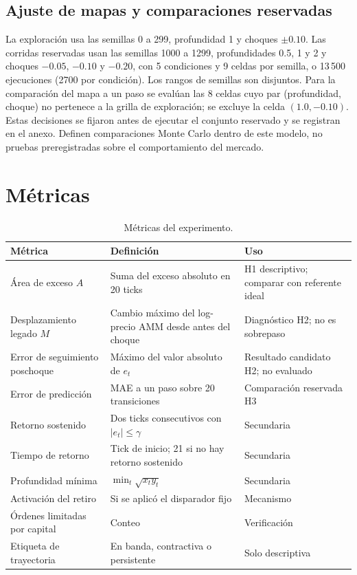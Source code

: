 \subsection{Ajuste de mapas y comparaciones reservadas}

La exploración usa las semillas 0 a 299, profundidad 1 y choques $\pm0.10$. Las corridas reservadas usan las semillas 1000 a 1299, profundidades 0.5, 1 y 2 y choques $-0.05$, $-0.10$ y $-0.20$, con 5 condiciones y 9 celdas por semilla, o 13\,500 ejecuciones (2700 por condición). Los rangos de semillas son disjuntos. Para la comparación del mapa a un paso se evalúan las 8 celdas cuyo par (profundidad, choque) no pertenece a la grilla de exploración; se excluye la celda $(1.0,-0.10)$. Estas decisiones se fijaron antes de ejecutar el conjunto reservado y se registran en el anexo. Definen comparaciones Monte Carlo dentro de este modelo, no pruebas preregistradas sobre el comportamiento del mercado.

\section{Métricas}

\begin{table}[htbp]
\centering
\caption{Métricas del experimento.}
\label{tab:metricas}
\small
\begin{tabularx}{\textwidth}{@{}l >{\raggedright\arraybackslash}X l@{}}
\toprule
Métrica & Definición & Uso \\
\midrule
Área de exceso $A$ & Suma del exceso absoluto en 20 ticks & H1 descriptivo; comparar con referente ideal \\
Desplazamiento legado $M$ & Cambio máximo del log-precio AMM desde antes del choque & Diagnóstico H2; no es sobrepaso \\
Error de seguimiento poschoque & Máximo del valor absoluto de $e_t$ & Resultado candidato H2; no evaluado \\
Error de predicción & MAE a un paso sobre 20 transiciones & Comparación reservada H3 \\
Retorno sostenido & Dos ticks consecutivos con $|e_t|\le\gamma$ & Secundaria \\
Tiempo de retorno & Tick de inicio; 21 si no hay retorno sostenido & Secundaria \\
Profundidad mínima & $\min_t\sqrt{x_ty_t}$ & Secundaria \\
Activación del retiro & Si se aplicó el disparador fijo & Mecanismo \\
Órdenes limitadas por capital & Conteo & Verificación \\
Etiqueta de trayectoria & En banda, contractiva o persistente & Solo descriptiva \\
\bottomrule
\end{tabularx}
\end{table}

